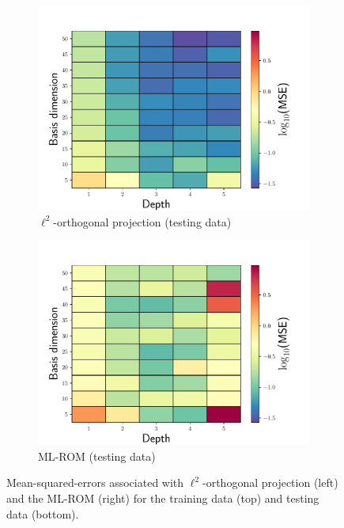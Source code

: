 \documentclass[3p,computermodern,10pt]{elsarticle}
\begin{document}
\begin{figure}
\begin{center}
\begin{subfigure}[t]{0.49\textwidth}
\includegraphics[trim={0cm 0cm 0cm 0cm},clip,width=1.0\linewidth]{code/burgers/synapse_models/basis_study/MSE_testing.pdf}
\caption{$\ell^2$-orthogonal projection (testing data)}
\end{subfigure}
\begin{subfigure}[t]{0.49\textwidth}
\includegraphics[trim={0cm 0cm 0cm 0cm},clip,width=1.0\linewidth]{code/burgers/synapse_models/basis_study/MSE_testing_ML.pdf}
\caption{ML-ROM (testing data)}
\end{subfigure}
\caption{Mean-squared-errors associated with $\ell^2$-orthogonal projection (left) and the ML-ROM (right) for the training data (top) and testing data (bottom).}
\label{fig:burg_training_test_projection_mse}
\end{center}
\end{figure}
\end{document}
